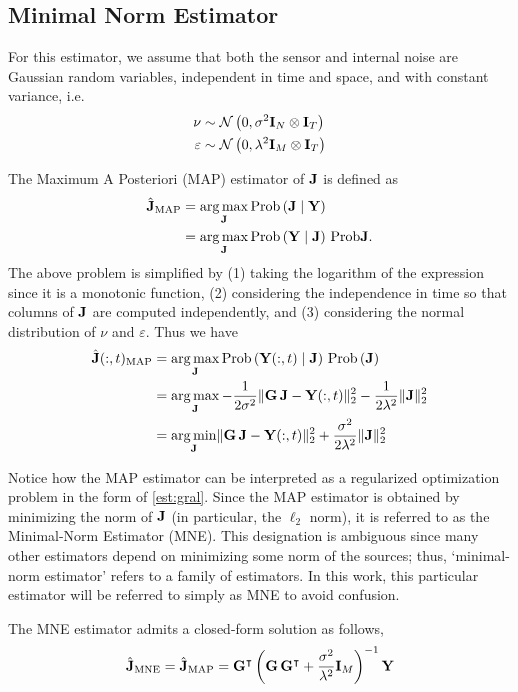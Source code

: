 \subsection{Minimal Norm Estimator}

For this estimator, we assume that both the sensor and internal noise are Gaussian random variables, independent in time and space, and with constant variance, i.e.
\begin{align}
\nu &\sim \mathcal{N}\left( 0, \sigma^2 \mathbf{I}_N \otimes \mathbf{I}_T   \right) \\
\varepsilon &\sim \mathcal{N}\left( 0, \lambda^2 \mathbf{I}_M \otimes \mathbf{I}_T \right)
\end{align}

The Maximum A Posteriori (MAP) estimator of $\mathbf{J}$ is defined as
\begin{align}
\hat{\mathbf{J}}_\text{MAP} 
&=
\operatorname*{arg\,max}_{\mathbf{J}} \text{Prob}\left(  \mathbf{J} \;\middle|\; \mathbf{Y}  \right)
\nonumber \\
&=
\operatorname*{arg\,max}_{\mathbf{J}} \text{Prob}\left(  \mathbf{Y} \;\middle|\; \mathbf{J}  \right)\, \text{Prob}{\mathbf{J}}.
\end{align}
The above problem is simplified by (1) taking the logarithm of the expression since it is a monotonic function, (2) considering the independence in time so that columns of $\mathbf{J}$ are computed independently, and (3) considering the normal distribution of $\nu$ and $\varepsilon$.
%
Thus we have
\begin{align}
\hat{\mathbf{J}}(:,t)_\text{MAP} 
&=
\operatorname*{arg\,max}_{\mathbf{J}} \text{Prob}\left(  \mathbf{Y}(:,t) \;\middle|\; \mathbf{J}  \right)\, \text{Prob}\left( \mathbf{J} \right)
\nonumber \\
&=
\operatorname*{arg\,max}_{\mathbf{J}}
- \frac{1}{2\sigma^2} \lVert \mathbf{G}\, \mathbf{J} - \mathbf{Y}(:,t) \rVert_2^2 
- \frac{1}{2\lambda^2} \lVert \mathbf{J}  \rVert_2^2 
\nonumber \\
&=
\operatorname*{arg\,min}_{\mathbf{J}}
\lVert \mathbf{G}\, \mathbf{J} - \mathbf{Y}(:,t) \rVert_2^2 
+ \frac{\sigma^2}{2\lambda^2} \lVert \mathbf{J}  \rVert_2^2 
\end{align}

Notice how the MAP estimator can be interpreted as a regularized optimization problem in the form of \eqref{est:gral}.
%
Since the MAP estimator is obtained by minimizing the norm of $\mathbf{J}$ (in particular, the $\ell_2$ norm), it is referred to as the Minimal-Norm Estimator (MNE).
%
This designation is ambiguous since many other estimators depend on minimizing some norm of the sources; thus, `minimal-norm estimator' refers to a family of estimators. 
%
In this work, this particular estimator will be referred to simply as MNE to avoid confusion.

The MNE estimator admits a closed-form solution as follows,
\begin{equation}
\hat{\mathbf{J}}_\text{MNE}
=
\hat{\mathbf{J}}_\text{MAP}
=
\mathbf{G}^\intercal\left(  \mathbf{G}\, \mathbf{G}^\intercal + \frac{\sigma^2}{\lambda^2}\mathbf{I}_M  \right)^{-1} \mathbf{Y}
\end{equation}

